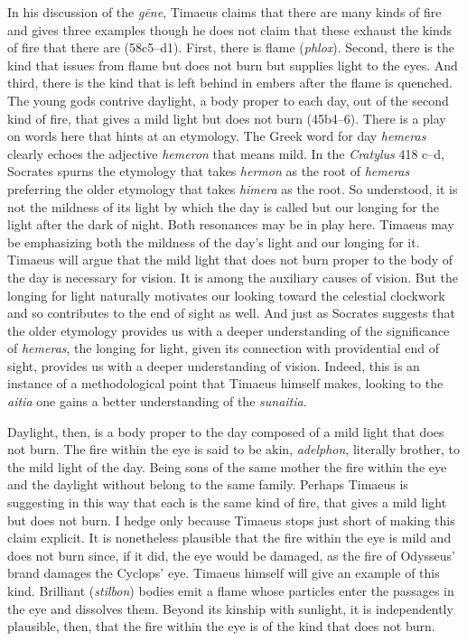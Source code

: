 In his discussion of the \emph{gēne}, Timaeus claims that there are many kinds of fire and gives three examples though he does not claim that these exhaust the kinds of fire that there are (58c5–d1). First, there is flame (\emph{phlox}). Second, there is the kind that issues from flame but does not burn but supplies light to the eyes. And third, there is the kind that is left behind in embers after the flame is quenched. The young gods contrive daylight, a body proper to each day, out of the second kind of fire, that gives a mild light but does not burn (45b4--6). There is a play on words here that hints at an etymology. The Greek word for day \emph{hemeras} clearly echoes the adjective \emph{hemeron} that means mild. In the \emph{Cratylus} 418 c--d, Socrates spurns the etymology that takes \emph{hermon} as the root of \emph{hemeras} preferring the older etymology that takes \emph{himera} as the root. So understood, it is not the mildness of its light by which the day is called but our longing for the light after the dark of night. Both resonances may be in play here. Timaeus may be emphasizing both the mildness of the day's light and our longing for it. Timaeus will argue that the mild light that does not burn proper to the body of the day is necessary for vision. It is among the auxiliary causes of vision. But the longing for light naturally motivates our looking toward the celestial clockwork and so contributes to the end of sight as well. And just as Socrates suggests that the older etymology provides us with a deeper understanding of the significance of \emph{hemeras}, the longing for light, given its connection with providential end of sight, provides us with a deeper understanding of vision. Indeed, this is an instance of a methodological point that Timaeus himself makes, looking to the \emph{aitia} one gains a better understanding of the \emph{sunaitia}.

Daylight, then, is a body proper to the day composed of a mild light that does not burn. The fire within the eye is said to be akin, \emph{adelphon}, literally brother, to the mild light of the day. Being sons of the same mother the fire within the eye and the daylight without belong to the same family. Perhaps Timaeus is suggesting in this way that each is the same kind of fire, that gives a mild light but does not burn. I hedge only because Timaeus stops just short of making this claim explicit. It is nonetheless plausible that the fire within the eye is mild and does not burn since, if it did, the eye would be damaged, as the fire of Odysseus' brand damages the Cyclops' eye. Timaeus himself will give an example of this kind. Brilliant (\emph{stilbon}) bodies emit a flame whose particles enter the passages in the eye and dissolves them. Beyond its kinship with sunlight, it is independently plausible, then, that the fire within the eye is of the kind that does not burn.

